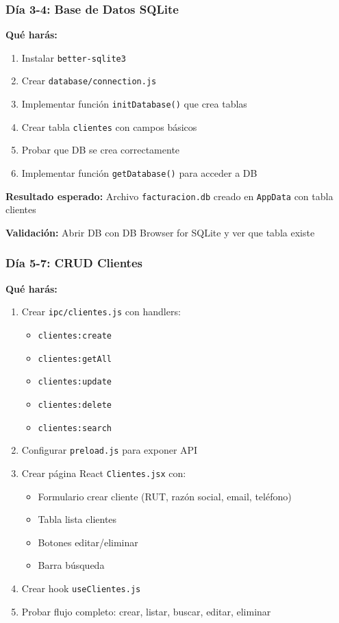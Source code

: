 \documentclass[11pt,a4paper]{article}
\begin{document}
\subsubsection{Día 3-4: Base de Datos SQLite}

\textbf{Qué harás:}
\begin{enumerate}
    \item Instalar \texttt{better-sqlite3}
    \item Crear \texttt{database/connection.js}
    \item Implementar función \texttt{initDatabase()} que crea tablas
    \item Crear tabla \texttt{clientes} con campos básicos
    \item Probar que DB se crea correctamente
    \item Implementar función \texttt{getDatabase()} para acceder a DB
\end{enumerate}

\textbf{Resultado esperado:} Archivo \texttt{facturacion.db} creado en \texttt{AppData} con tabla clientes

\textbf{Validación:} Abrir DB con DB Browser for SQLite y ver que tabla existe

\subsubsection{Día 5-7: CRUD Clientes}

\textbf{Qué harás:}
\begin{enumerate}
    \item Crear \texttt{ipc/clientes.js} con handlers:
    \begin{itemize}
        \item \texttt{clientes:create}
        \item \texttt{clientes:getAll}
        \item \texttt{clientes:update}
        \item \texttt{clientes:delete}
        \item \texttt{clientes:search}
    \end{itemize}
    \item Configurar \texttt{preload.js} para exponer API
    \item Crear página React \texttt{Clientes.jsx} con:
    \begin{itemize}
        \item Formulario crear cliente (RUT, razón social, email, teléfono)
        \item Tabla lista clientes
        \item Botones editar/eliminar
        \item Barra búsqueda
    \end{itemize}
    \item Crear hook \texttt{useClientes.js}
    \item Probar flujo completo: crear, listar, buscar, editar, eliminar
\end{enumerate}
\end{document}
